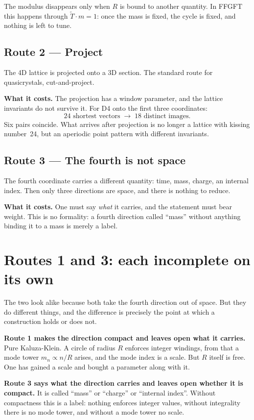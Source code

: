 \documentclass[11pt]{report}
\begin{document}
The modulus disappears only when $R$ is bound to another quantity. In
FFGFT this happens through $\tilde T \cdot m = 1$: once the mass is
fixed, the cycle is fixed, and nothing is left to tune.

\section{Route 2 --- Project}

The 4D lattice is projected onto a 3D section. The standard route for
quasicrystals, cut-and-project.

\textbf{What it costs.} The projection has a window parameter, and the
lattice invariants do not survive it. For D4 onto the first three
coordinates:
\[
  24 \text{ shortest vectors} \;\longrightarrow\; 18 \text{ distinct images.}
\]
Six pairs coincide. What arrives after projection is no longer a
lattice with kissing number~24, but an aperiodic point pattern with
different invariants.

\section{Route 3 --- The fourth is not space}

The fourth coordinate carries a different quantity: time, mass, charge,
an internal index. Then only three directions are space, and there is
nothing to reduce.

\textbf{What it costs.} One must say \emph{what} it carries, and the
statement must bear weight. This is no formality: a fourth direction
called \enquote{mass} without anything binding it to a mass is merely a
label.

\chapter{Routes 1 and 3: each incomplete on its own}

The two look alike because both take the fourth direction out of space.
But they do different things, and the difference is precisely the point
at which a construction holds or does not.

\textbf{Route 1 makes the direction compact and leaves open what it
carries.} Pure Kaluza-Klein. A circle of radius $R$ enforces integer
windings, from that a mode tower $m_n \propto n/R$ arises, and the mode
index is a scale. But $R$ itself is free. One has gained a scale and
bought a parameter along with it.

\textbf{Route 3 says what the direction carries and leaves open whether
it is compact.} It is called \enquote{mass} or \enquote{charge} or
\enquote{internal index}. Without compactness this is a label: nothing
enforces integer values, without integrality there is no mode tower,
and without a mode tower no scale.
\end{document}
